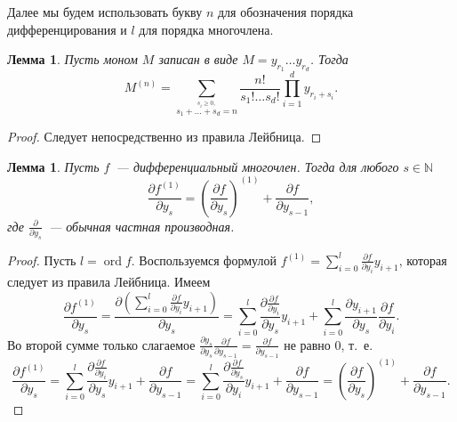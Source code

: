 \documentclass[16pt]{article}
\DeclareMathOperator{\ord}{ord}
\renewcommand{\ge}{\geqslant} %
\theoremstyle{plain1}
\newtheorem{lemma}[theorem1]{Лемма}
\theoremstyle{plain2}
\theoremstyle{plain}
\theoremstyle{plain3}
\theoremstyle{definition}
\theoremstyle{remark}
\begin{document}
Далее мы будем использовать букву $n$ для обозначения порядка дифференцирования и $l$ для порядка многочлена.


\begin{lemma}\label{lemma:der_monom}
Пусть моном $M$ записан в виде $M=y_{r_1}\ldots y_{r_d}$. Тогда
$$
M^{(n)} =\sum\limits_{\stackrel{s_i\ge0,}{
s_1+\ldots+s_d=n}}\frac{n!}{s_1!\ldots s_d!}
\prod\limits_{i=1}^dy_{r_i+s_i}.
$$
\end{lemma}
\begin{proof}
Следует непосредственно из правила Лейбница.
\end{proof}


\begin{lemma}\label{lemma:commutative derivatives}
Пусть $f$~--- дифференциальный многочлен. Тогда для любого $s\in\mathbb{N}$ 
$$
\frac{\partial f^{(1)}}{\partial y_s}=\left(\frac{\partial f}{\partial y_s}\right)^{(1)}+\frac{\partial f}{\partial y_{s-1}},
$$
где $\frac{\partial}{\partial y_s}$~--- обычная частная производная.
\end{lemma}
\begin{proof}
Пусть $l=\ord f$. Воспользуемся формулой $f^{(1)}=\sum\limits_{i=0}^l\frac{\partial f}{\partial y_i}y_{i+1}$, которая следует из правила Лейбница. Имеем 
$$
\frac{\partial f^{(1)}}{\partial y_s}=\frac{\partial\left(\sum\limits_{i=0}^l\frac{\partial f}{\partial y_i}y_{i+1}\right)}{\partial y_s}=\sum\limits_{i=0}^l\frac{\partial \frac{\partial f}{\partial y_i} }{\partial y_s}y_{i+1}+\sum\limits_{i=0}^l\frac{\partial y_{i+1}}{\partial y_s}\frac{\partial f}{\partial y_i}.
$$
Во второй сумме только слагаемое 
$\frac{\partial y_{s}}{\partial y_s}\frac{\partial f}{\partial y_{s-1}}=\frac{\partial f}{\partial y_{s-1}}$ 
не равно 0, т.~е. 
$$
\frac{\partial f^{(1)}}{\partial y_s}=\sum\limits_{i=0}^l\frac{\partial \frac{\partial f}{\partial y_i}}{\partial y_s}y_{i+1}+\frac{\partial f}{\partial y_{s-1}}=\sum\limits_{i=0}^l\frac{\partial \frac{\partial f}{\partial y_s}}{\partial y_i}y_{i+1}+\frac{\partial f}{\partial y_{s-1}}=\left(\frac{\partial f}{\partial y_s}\right)^{(1)}+\frac{\partial f}{\partial y_{s-1}}.
$$
\end{proof}
\end{document}
